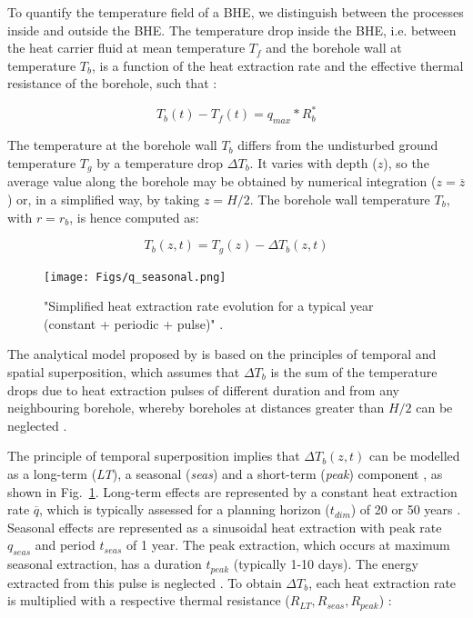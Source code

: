 To quantify the temperature field of a BHE, we distinguish between the processes inside and outside the BHE. The temperature drop inside the BHE, i.e. between the heat carrier fluid at mean temperature $T_f$ and the borehole wall at temperature $T_b$, is a function of the heat extraction rate and the effective thermal resistance of the borehole, such that \citep{claesson_conductive_1988}:

\begin{equation}
\label{eq:T_b}
    T_b(t) - T_f(t) = q_\mathit{max}*R_b^*
\end{equation}


The temperature at the borehole wall $T_b$ differs from the undisturbed ground temperature $T_g$ by a temperature drop $\Delta T_b$. It varies with depth ($z$), so the average value along the borehole may be obtained by numerical integration ($z = \overline{z}$) or, in a simplified way, by taking $z = H/2$. The borehole wall temperature $T_b$, with $r = r_b$, is hence computed as:

\begin{equation}
    T_b(z, t) = T_g(z) - \Delta T_b(z, t)
\end{equation}

\begin{figure}
    \centering
    \texttt{[image: Figs/q\_seasonal.png]}
    \caption{"Simplified heat extraction rate evolution for a typical year (constant + periodic + pulse)" \citep{pahud_geothermal_2002}.}
    \label{fig:q_seasonal}
\end{figure}

The analytical model proposed by \citet{eskilson_thermal_1987} is based on the principles of temporal and spatial superposition, which assumes that $\Delta T_b$ is the sum of the temperature drops due to heat extraction pulses of different duration and from any neighbouring borehole, whereby boreholes at distances greater than $H/2$ can be neglected \cite{pahud_geothermal_2002}.

The principle of temporal superposition implies that $\Delta T_b(z, t)$ can be modelled as a long-term (\textit{LT}), a seasonal (\textit{seas}) and a short-term (\textit{peak}) component \citep{claesson_conductive_1988}, as shown in Fig.~\ref{fig:q_seasonal}.
%
%
Long-term effects are represented by a constant heat extraction rate $\overline{q}$, which is typically assessed for a planning horizon ($t_\mathit{dim}$) of 20 or 50 years \cite{pahud_geothermal_2002,miglani_methodology_2018}. 
Seasonal effects are represented as a sinusoidal heat extraction with peak rate $q_\mathit{seas}$ and period $t_\mathit{seas}$ of 1 year.
The peak extraction, which occurs at maximum seasonal extraction, has a duration $t_\mathit{peak}$ (typically 1-10 days). The energy extracted from this pulse is neglected \cite{claesson_conductive_1988}. 
To obtain $\Delta T_b$, each heat extraction rate is multiplied with a respective thermal resistance ($R_{LT},R_\mathit{seas},R_\mathit{peak}$) \cite{claesson_conductive_1988}:

